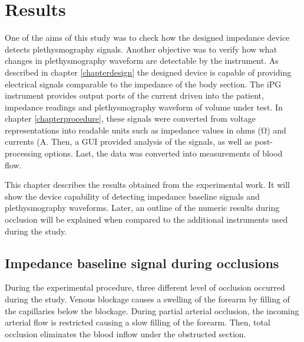 
\chapter{Results}  %
\label{chapterresults}

\ifpdf
\graphicspath{{Chapter5/Figs/Raster/}{Chapter5/Figs/PDF/}{Chapter5/Figs/}}
\else
\graphicspath{{Chapter5/Figs/Vector/}{Chapter5/Figs/}}
\fi

One of the aims of this study was to check how the designed impedance device detects plethysmography signals. Another objective was to verify how what changes in plethysmography waveform are detectable by the instrument. As described in chapter \ref{chapterdesign} the designed device is capable of providing electrical signals comparable to the impedance of the body section. The iPG instrument provides output ports of the current driven into the patient, impedance readings and plethysmography waveform of volume under test. In chapter \ref{chapterprocedure}, these signals were converted from voltage representations into readable units such as impedance values in ohms (\si{\ohm}) and currents (\si{\ampere}. Then, a GUI provided analysis of the signals, as well as post-processing options. Last, the data was converted into measurements of blood flow.


This chapter describes the results obtained from the experimental work. It will show the device capability of detecting impedance baseline signals and plethysmography waveforms. Later, an outline of the numeric results during occlusion will be explained when compared to the additional instruments used during the study. 


\section{Impedance baseline signal during occlusions}
\label{section5.1}
During the experimental procedure, three different level of occlusion occurred during the study. Venous blockage causes a swelling of the forearm by filling of the capillaries below the blockage. During partial arterial occlusion, the incoming arterial flow is restricted causing a slow filling of the forearm. Then, total occlusion eliminates the blood inflow under the obstructed section. 

